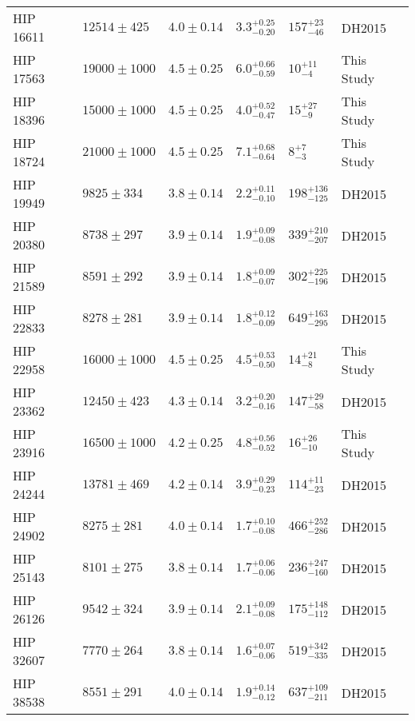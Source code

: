 \documentclass{emulateapj}
\begin{document}
\begin{longtable*}{|l|lllll|}
  HIP 16611 &   $12514 \pm 425$ &  $4.0 \pm 0.14$ &  $3.3^{+0.25}_{-0.20}$ &    $157^{+23}_{-46}$ &      DH2015 \\
  HIP 17563 &  $19000 \pm 1000$ &  $4.5 \pm 0.25$ &  $6.0^{+0.66}_{-0.59}$ &      $10^{+11}_{-4}$ &  This Study \\
  HIP 18396 &  $15000 \pm 1000$ &  $4.5 \pm 0.25$ &  $4.0^{+0.52}_{-0.47}$ &      $15^{+27}_{-9}$ &  This Study \\
  HIP 18724 &  $21000 \pm 1000$ &  $4.5 \pm 0.25$ &  $7.1^{+0.68}_{-0.64}$ &        $8^{+7}_{-3}$ &  This Study \\
  HIP 19949 &    $9825 \pm 334$ &  $3.8 \pm 0.14$ &  $2.2^{+0.11}_{-0.10}$ &  $198^{+136}_{-125}$ &      DH2015 \\
  HIP 20380 &    $8738 \pm 297$ &  $3.9 \pm 0.14$ &  $1.9^{+0.09}_{-0.08}$ &  $339^{+210}_{-207}$ &      DH2015 \\
  HIP 21589 &    $8591 \pm 292$ &  $3.9 \pm 0.14$ &  $1.8^{+0.09}_{-0.07}$ &  $302^{+225}_{-196}$ &      DH2015 \\
  HIP 22833 &    $8278 \pm 281$ &  $3.9 \pm 0.14$ &  $1.8^{+0.12}_{-0.09}$ &  $649^{+163}_{-295}$ &      DH2015 \\
  HIP 22958 &  $16000 \pm 1000$ &  $4.5 \pm 0.25$ &  $4.5^{+0.53}_{-0.50}$ &      $14^{+21}_{-8}$ &  This Study \\
  HIP 23362 &   $12450 \pm 423$ &  $4.3 \pm 0.14$ &  $3.2^{+0.20}_{-0.16}$ &    $147^{+29}_{-58}$ &      DH2015 \\
  HIP 23916 &  $16500 \pm 1000$ &  $4.2 \pm 0.25$ &  $4.8^{+0.56}_{-0.52}$ &     $16^{+26}_{-10}$ &  This Study \\
  HIP 24244 &   $13781 \pm 469$ &  $4.2 \pm 0.14$ &  $3.9^{+0.29}_{-0.23}$ &    $114^{+11}_{-23}$ &      DH2015 \\
  HIP 24902 &    $8275 \pm 281$ &  $4.0 \pm 0.14$ &  $1.7^{+0.10}_{-0.08}$ &  $466^{+252}_{-286}$ &      DH2015 \\
  HIP 25143 &    $8101 \pm 275$ &  $3.8 \pm 0.14$ &  $1.7^{+0.06}_{-0.06}$ &  $236^{+247}_{-160}$ &      DH2015 \\
  HIP 26126 &    $9542 \pm 324$ &  $3.9 \pm 0.14$ &  $2.1^{+0.09}_{-0.08}$ &  $175^{+148}_{-112}$ &      DH2015 \\
  HIP 32607 &    $7770 \pm 264$ &  $3.8 \pm 0.14$ &  $1.6^{+0.07}_{-0.06}$ &  $519^{+342}_{-335}$ &      DH2015 \\
  HIP 38538 &    $8551 \pm 291$ &  $4.0 \pm 0.14$ &  $1.9^{+0.14}_{-0.12}$ &  $637^{+109}_{-211}$ &      DH2015 \\

\end{longtable*}
\end{document}
